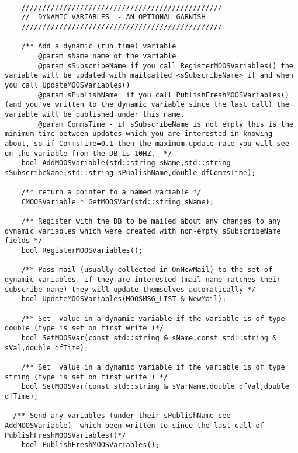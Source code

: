 \documentclass[a4paper,10pt]{article}
\begin{document}
\begin{lstlisting}

    ////////////////////////////////////////////////
    //  DYNAMIC VARIABLES  - AN OPTIONAL GARNISH
    ////////////////////////////////////////////////

    /** Add a dynamic (run time) variable
        @param sName name of the variable
        @param sSubscribeName if you call RegisterMOOSVariables() the variable will be updated with mailcalled <sSubscribeName> if and when you call UpdateMOOSVariables()
        @param sPublishName  if you call PublishFreshMOOSVariables() (and you've written to the dynamic variable since the last call) the variable will be published under this name.
        @param CommsTime - if sSubscribeName is not empty this is the minimum time between updates which you are interested in knowing about, so if CommsTime=0.1 then the maximum update rate you will see on the variable from the DB is 10HZ.  */
    bool AddMOOSVariable(std::string sName,std::string sSubscribeName,std::string sPublishName,double dfCommsTime);

    /** return a pointer to a named variable */
    CMOOSVariable * GetMOOSVar(std::string sName);

    /** Register with the DB to be mailed about any changes to any dynamic variables which were created with non-empty sSubscribeName fields */
    bool RegisterMOOSVariables();
	
    /** Pass mail (usually collected in OnNewMail) to the set of dynamic variables. If they are interested (mail name matches their subscribe name) they will update themselves automatically */
    bool UpdateMOOSVariables(MOOSMSG_LIST & NewMail);

    /** Set  value in a dynamic variable if the variable is of type double (type is set on first write )*/
    bool SetMOOSVar(const std::string & sName,const std::string & sVal,double dfTime);

    /** Set  value in a dynamic variable if the variable is of type string (type is set on first write ) */
    bool SetMOOSVar(const std::string & sVarName,double dfVal,double dfTime);

  /** Send any variables (under their sPublishName see AddMOOSVariable)  which been written to since the last call of PublishFreshMOOSVariables()*/
    bool PublishFreshMOOSVariables();
\end{lstlisting}
\end{document}
